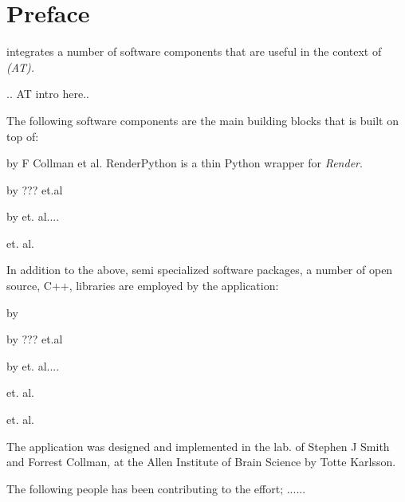 
\doublespacing

\usechapterimagefalse %
\chapter*{Preface}
\ate integrates a number of software components that are useful in the context of \emph{\at  (AT). }


.. AT intro here..

The following software components are the main building blocks that \ate is built on top of:

\begin{description}[font=$\bullet$~\normalfont\scshape\color{red!50!black}]
\item [Render Python] by F Collman et al. RenderPython is a thin Python wrapper for \emph{Render}.
\item [Render] by ??? et.al 
\item [Fiji] by et. al....
\item [Docker] et. al.
\end{description}

In addition to the above, semi specialized software packages, a number of open source, C++, libraries are employed by the \ate application:

\begin{description}[font=$\bullet$~\normalfont\scshape\color{red!50!black}]
\item [VTK] by 
\item [Poco] by ??? et.al 
\item [libCURL] by et. al....
\item [TinyXML2] et. al.
\item [Dune Scientific Library (dsl) ] et. al.
\end{description}

The \ate application was designed and implemented in the lab. of  Stephen J Smith and Forrest Collman, at the Allen Institute of Brain Science by Totte Karlsson.

The following people has been contributing to the effort; ......


\cleardoublepage
